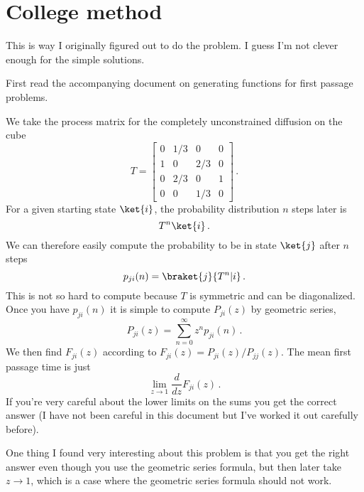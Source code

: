 \documentclass{article}
\begin{document}
\section{College method}

This is way I originally figured out to do the problem. I guess I'm not clever enough for the simple solutions.

First read the accompanying document on generating functions for first passage problems.

We take the process matrix for the completely unconstrained diffusion on the cube
\begin{equation}
T = \left[ \begin{matrix} 0 & 1/3 & 0 & 0 \\ 1 & 0 & 2/3 & 0 \\ 0 & 2/3 & 0 & 1 \\ 0 & 0 & 1/3 & 0\end{matrix} \right] \, .
\end{equation}
For a given starting state $\ket{i}$, the probability distribution $n$ steps later is
\begin{equation}
T^n \ket{i} \, .
\end{equation}
We can therefore easily compute the probability to be in state $\ket{j}$ after $n$ steps
\begin{equation}
p_{ji}(n) = \braket{j}{T^n | i} \, .
\end{equation}
This is not so hard to compute because $T$ is symmetric and can be diagonalized.
Once you have $p_{ji}(n)$ it is simple to compute $P_{ji}(z)$ by geometric series,
\begin{equation}
P_{ji}(z) = \sum_{n=0}^{\infty}z^n p_{ji}(n) \, .
\end{equation}
We then find $F_{ji}(z)$ according to $F_{ji}(z) = P_{ji}(z)/P_{jj}(z)$.
The mean first passage time is just
\begin{equation}
\lim_{z\rightarrow 1} \frac{d}{dz}F_{ji}(z) \, .
\end{equation}
If you're very careful about the lower limits on the sums you get the correct answer (I have not been careful in this document but I've worked it out carefully before).

One thing I found very interesting about this problem is that you get the right answer even though you use the geometric series formula, but then later take $z\rightarrow 1$, which is a case where the geometric series formula should not work.
\end{document}
